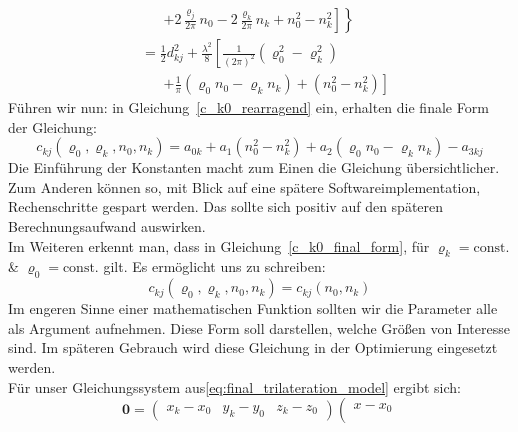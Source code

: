 {\begin{align}
    &\phantom{=}\;
   	\left.\left.+2\frac{\varrho_j}{2\pi}n_0-2\frac{\varrho_k}{2\pi}n_k+n_0^2-n_k^2\right]\right\}\\
%	
	&=\frac{1}{2}d_{kj}^2+\frac{\lambda^2}{8}\left[\frac{1}{(2\pi)^2}\left(\varrho_0^2-\varrho_k^2\right) \right.\nonumber\\
	&\phantom{=}\;
	\left. +\frac{1}{\pi}\left(\varrho_0n_0-\varrho_kn_k\right)+\left(n_0^2-n_k^2\right)\right]\label{c_k0_rearragend}
\end{align}
%
Führen wir nun:
%
in Gleichung~\eqref{c_k0_rearragend} ein, erhalten die finale Form der Gleichung:
\begin{equation}
c_{kj}(\varrho_0, \varrho_k, n_0, n_k) = a_{0k}+a_1(n_0^2-n_k^2)+a_2(\varrho_0n_0-\varrho_kn_k)-a_{3kj}\label{c_k0_final_form}   
\end{equation}
%
Die Einführung der Konstanten macht zum Einen die Gleichung übersichtlicher. Zum Anderen können so, mit Blick auf eine spätere Softwareimplementation, Rechenschritte gespart werden. Das sollte sich positiv auf den späteren Berechnungsaufwand auswirken.\\
%
Im Weiteren erkennt man, dass in Gleichung~\eqref{c_k0_final_form}, für $\varrho_k=\text{const.}$ \& $\varrho_0=\text{const.}$ gilt. Es ermöglicht uns zu schreiben:
\begin{equation}
c_{kj}(\varrho_0, \varrho_k, n_0, n_k) = c_{kj}(n_0, n_k)
\end{equation}
%
Im engeren Sinne einer mathematischen Funktion sollten wir die Parameter alle als Argument aufnehmen. Diese Form soll darstellen, welche Größen von Interesse sind. Im späteren Gebrauch wird diese Gleichung in der Optimierung eingesetzt werden.\\
%
Für unser Gleichungssystem aus\eqref{eq:final_trilateration_model} ergibt sich:
%
\begin{equation}\label{eq:wavenumber_trilateration_model}
\mathbf{0}=
\left(
	\begin{array}{ccc}
		x_k-x_0 & y_k-y_0 & z_k-z_0 
	\end{array}
\right)
\left(
   \begin{array}{c}
	   x-x_0\\

\end{array}
\end{equation}}
